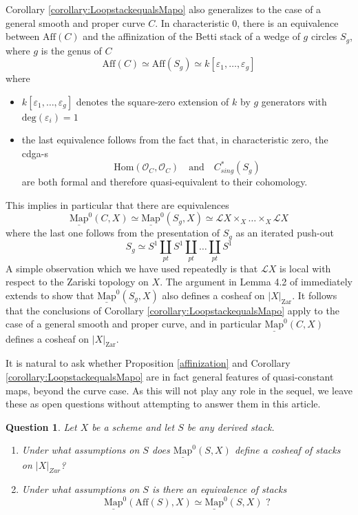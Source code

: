 \documentclass[11pt,letterpaper]{amsart}
\newtheorem{question}[dummy]{Question}
\newcommand{\cO}{\mathcal{O}}
\newcommand{\cL}{\mathcal{L}}
\newcommand{\Mapo}[2]{\underline{\mathrm{Map}}^{0}\left (#1,#2\right )}
\newcommand{\Zar}[1]{|#1|_{\mathrm{Zar}}}
\begin{document}
Corollary \ref{corollary:LoopstackequalsMapo} also generalizes to the case of a general smooth and proper curve $C$.   
In characteristic 0, there is an equivalence between $\mathrm{Aff}(C)$ and the affinization of the Betti stack of a wedge of $g$ circles $S_g$, where $g$ is the genus of $C$
$$
\mathrm{Aff}(C) \simeq  \mathrm{Aff}(S_g) \simeq k[\varepsilon_1, \ldots, \varepsilon_g]
$$  
where 
\begin{itemize}
\item $k[\varepsilon_1, \ldots, \varepsilon_g]$ denotes the square-zero extension of $k$ by $g$ generators with $\mathrm{deg}(\varepsilon_i)=1$
\item the last equivalence follows from the fact that, in characteristic zero, the cdga-s 
$$\mathrm{Hom}(\cO_C, \cO_C) \quad \text{and} \quad C^*_{sing}(S_g)$$ 
are both formal and therefore quasi-equivalent to their cohomology.
\end{itemize}
 This implies in particular that there are equivalences 
 $$
 \Mapo{C}{X} \simeq \Mapo{S_g}{X} \simeq \cL X \times_X \ldots \times_X \cL X
 $$
 where the last  one follows from the presentation of $S_g$ as an iterated push-out  
 $$
 S_g \simeq S^1 \coprod_{pt} S^1 \coprod_{pt} \ldots \coprod_{pt} S^1
 $$
A simple  observation which we have used repeatedly is that $\cL X$ is local with respect to the Zariski topology on $X$. The argument in Lemma 4.2 of \cite{BZNLoopConn} immediately extends to show that $\Mapo{S_g}{X}$ also defines a cosheaf on $\Zar{X}$. It follows that the conclusions of Corollary \ref{corollary:LoopstackequalsMapo} apply to the case of a general smooth and proper curve, and in particular $\Mapo{C}{X}$ defines a cosheaf on $\Zar{X}$. 

It is natural to ask whether Proposition \ref{affinization}  and Corollary \ref{corollary:LoopstackequalsMapo} are in fact general features of quasi-constant maps, beyond the curve case. As this will not play any role in the sequel, we   leave these as open questions without attempting to answer them in this article.
\begin{question}
Let $X$ be a scheme and let $S$ be any derived stack.
\begin{enumerate}
\item Under what assumptions on $S$ does $\Mapo{S}{X}$ define a cosheaf of stacks on $|X|_{Zar}$? 
\item Under what assumptions on $S$  is there an equivalence of stacks
$$
\Mapo{\mathrm{Aff}(S)}{X} 
 \simeq  \Mapo{S}{X}  \, \, ?
$$
\end{enumerate}
\end{question}
\end{document}
